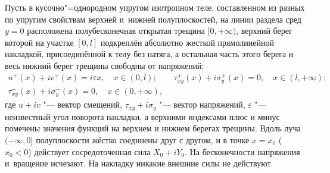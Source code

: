 


\date{27/I/2011} %



\maketitle


Пусть в кусочно"=однородном упругом изотропном теле, составленном из разных по упругим свойствам верхней и~нижней полуплоскостей, на линии раздела сред $y=0$  расположена полубесконечная открытая трещина \mbox{$[0, +\infty)$,} 
верхний берег которой на участке $[0, l]$ подкреплён абсолютно жесткой прямолинейной накладкой, присоединённой к телу без натяга, а остальная часть этого берега и весь нижний берег трещины свободны от напряжений:
\begin{gather*}
u^{+}(x)+i v^{+}(x)=i\varepsilon x,\quad  x\in(0, l); \qquad
\tau_{xy}^{+}(x)+i\sigma_y^{+}(x)=0,\quad x\in(l, +\infty);\\
\tau_{xy}^{-}(x)+i\sigma_y^{-}(x)=0,\quad x\in(0, +\infty),
\end{gather*}
где  $u+iv$ "--- вектор смещений,  $\tau_{xy}+i\sigma_{y}$ "--- вектор напряжений, $\varepsilon$ "--- неизвестный угол поворота накладки, а верхними индексами плюс и минус помечены значения функций на верхнем и нижнем берегах трещины. Вдоль луча \mbox{$(-\infty, 0]$}  полуплоскости жёстко соединены друг с другом, и в точке  $x=x_0$ ($x_0<0$) действует сосредоточенная сила  $X_0+iY_0$. На бесконечности напряжения и~вращение исчезают. На накладку никакие внешние силы не действуют.

